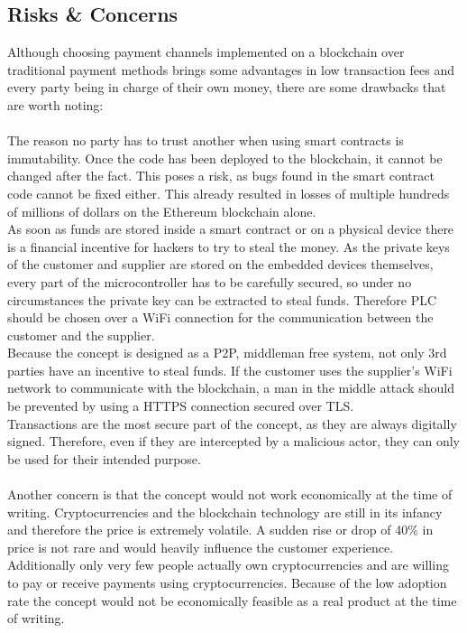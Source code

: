 \subsection{Risks \& Concerns}
Although choosing payment channels implemented on a blockchain over traditional payment methods brings some advantages in low transaction fees and every party being in charge of their own money, there are some drawbacks that are worth noting:
\\\\
The reason no party has to trust another when using smart contracts is immutability.
Once the code has been deployed to the blockchain, it cannot be changed after the fact.
This poses a risk, as bugs found in the smart contract code cannot be fixed either.
This already resulted in losses of multiple hundreds of millions of dollars on the Ethereum blockchain alone\cite{dao-hack}.
\\
As soon as funds are stored inside a smart contract or on a physical device there is a financial incentive for hackers to try to steal the money.
As the private keys of the customer and supplier are stored on the embedded devices themselves, every part of the microcontroller has to be carefully secured, so under no circumstances the private key can be extracted to steal funds.
Therefore PLC should be chosen over a WiFi connection for the communication between the customer and the supplier.
\\
Because the concept is designed as a P2P, middleman free system, not only 3rd parties have an incentive to steal funds.
If the customer uses the supplier's WiFi network to communicate with the blockchain, a man in the middle attack should be prevented by using a HTTPS connection secured over TLS.
\\
Transactions are the most secure part of the concept, as they are always digitally signed.
Therefore, even if they are intercepted by a malicious actor, they can only be used for their intended purpose.
\\\\
Another concern is that the concept would not work economically at the time of writing.
Cryptocurrencies and the blockchain technology are still in its infancy and therefore the price is extremely volatile.
A sudden rise or drop of 40\% in price is not rare and would heavily influence the customer experience.
Additionally only very few people actually own cryptocurrencies and are willing to pay or receive payments using cryptocurrencies.
Because of the low adoption rate the concept would not be economically feasible as a real product at the time of writing.
\newpage
